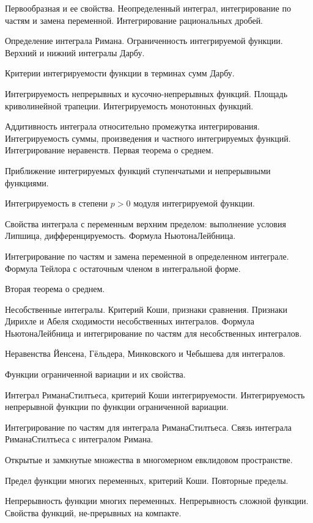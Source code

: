 \documentclass[a4paper]{article}
\begin{document}
\begin{nums}{-3}
\item Первообразная и ее свойства. Неопределенный интеграл, интегрирование по частям и замена переменной.
Интегрирование рациональных дробей.
\item Определение интеграла Римана. Ограниченность интегрируемой функции. Верхний и нижний интегралы Дарбу.
\item Критерии интегрируемости функции в терминах сумм Дарбу.
\item Интегрируемость непрерывных и кусочно-непрерывных функций. Площадь криволинейной трапеции.
Интегрируемость монотонных функций.
\item Аддитивность интеграла относительно промежутка интегрирования. Интегрируемость
суммы, произведения и частного интегрируемых функций. Интегрирование неравенств. Первая теорема о среднем.
\item Приближение интегрируемых функций ступенчатыми и непрерывными функциями.
\item Интегрируемость в степени $p>0$ модуля интегрируемой функции.
\item Свойства интеграла с переменным верхним пределом: выполнение условия Липшица, дифференцируемость.
Формула Ньютона\ч Лейбница.
\item Интегрирование по частям и замена переменной в определенном интеграле. Формула Тейлора с остаточным
членом в интегральной форме.
\item Вторая теорема о среднем.
\item Несобственные интегралы. Критерий Коши, признаки сравнения. Признаки Дирихле и Абеля
сходимости несобственных интегралов. Формула Ньютона\ч Лейбница и интегрирование по частям для несобственных интегралов.
\item Неравенства Йенсена, Гёльдера, Минковского и Чебышева для интегралов.
\item Функции ограниченной вариации и их свойства.
\item Интеграл Римана\ч Стилтьеса, критерий Коши интегрируемости. Интегрируемость непрерывной функции
по функции ограниченной вариации.
\item Интегрирование по частям для интеграла Римана\ч Стилтьеса. Связь интеграла Римана\ч Стилтьеса с интегралом Римана.
\item Открытые и замкнутые множества в многомерном евклидовом пространстве.
\item Предел функции многих переменных, критерий Коши. Повторные пределы.
\item Непрерывность функции многих переменных. Непрерывность сложной функции. Свойства функций, не-\break прерывных на компакте.

\end{nums}
\end{document}

